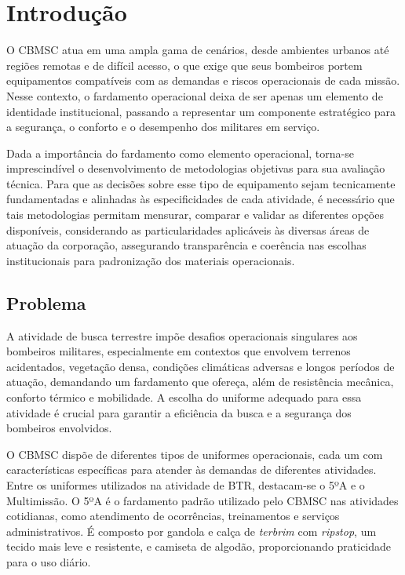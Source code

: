 \chapter{Introdução}



	    O \acrfull{CBMSC} atua em uma ampla gama de cenários, desde ambientes urbanos até 
		regiões remotas e de difícil acesso, o que exige que seus bombeiros portem equipamentos 
		compatíveis com as demandas e riscos operacionais de cada missão. Nesse contexto, o 
		fardamento operacional deixa de ser apenas um elemento de identidade institucional, passando 
		a representar um componente estratégico para a segurança, o conforto e o desempenho dos 
		militares em serviço.

    	Dada a importância do fardamento como elemento operacional, torna-se imprescindível o 
		desenvolvimento de metodologias objetivas para sua avaliação técnica. Para que as decisões sobre esse 
		tipo de equipamento sejam tecnicamente fundamentadas e alinhadas às especificidades de cada 
		atividade, é necessário que tais 
		metodologias permitam mensurar, comparar e validar as diferentes opções disponíveis, 
		considerando as particularidades aplicáveis às diversas áreas de atuação da corporação, 
		assegurando transparência e coerência nas escolhas institucionais para padronização dos 
		materiais operacionais.

	\section{Problema}

		A atividade de busca terrestre impõe desafios operacionais singulares aos bombeiros militares,
		 especialmente em contextos que envolvem terrenos acidentados, vegetação densa, condições climáticas 
		 adversas e longos períodos de atuação, demandando um fardamento que ofereça, além de resistência mecânica, conforto térmico e mobilidade.  
		A escolha do uniforme adequado para essa atividade é crucial para garantir a eficiência da busca e a segurança dos bombeiros envolvidos.

		O \acrshort{CBMSC} dispõe de diferentes tipos de uniformes operacionais, cada um com características específicas para atender
		às demandas de diferentes atividades.  Entre os uniformes utilizados na atividade de \acrfull{BTR}, destacam-se o 5ºA e o Multimissão.
		O 5ºA é o fardamento padrão utilizado pelo \acrshort{CBMSC} nas atividades cotidianas, como atendimento de ocorrências,
		treinamentos e serviços administrativos. É composto por gandola e calça de \textit{terbrim} com \textit{ripstop}, um tecido mais leve e 
		resistente, e camiseta de algodão, proporcionando praticidade para o uso diário.

